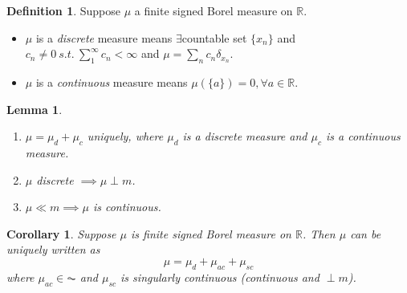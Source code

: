 \documentclass{report}
\newcommand{\R}{\mathbb{R}}
\newcommand{\st}{\ s.t.\ }
\newtheorem{corollary}[theorem]{Corollary}
\newtheorem{lemma}[theorem]{Lemma}
\theoremstyle{definition}
\newtheorem{definition}[theorem]{Definition}
\theoremstyle{remark}
\begin{document}
\begin{definition}
	Suppose $\mu$ a finite signed Borel measure on $\R$. 
	\begin{itemize}
		\item $\mu$ is a \emph{discrete} measure means $\exists$countable set $\{x_n\}$ and $c_n \neq 0 \st \sum_{1}^\infty c_n < \infty$ and $\mu = \sum_n c_n \delta_{x_n}$.
		\item $\mu$ is a \emph{continuous} measure means $\mu(\{a\}) = 0, \forall a \in \R$.
	\end{itemize}
\end{definition}
\begin{lemma}
	\begin{enumerate}
		\item $\mu = \mu_d + \mu_c$ uniquely, where $\mu_d$ is a discrete measure and $\mu_c$ is a continuous measure.
		\item $\mu$ discrete $\implies \mu \perp m$.
		\item $\mu \ll m \implies \mu$ is continuous.
	\end{enumerate}
\end{lemma}
\begin{corollary}
	Suppose $\mu$ is finite signed Borel measure on $\R$. Then $\mu$ can be uniquely written as \[
		\mu = \mu_d + \mu_{ac} + \mu_{sc}	
	\] where $\mu_{ac} \in \AC$ and $\mu_{sc}$ is singularly continuous (continuous and $\perp m$).
\end{corollary}

{}

\end{document}
